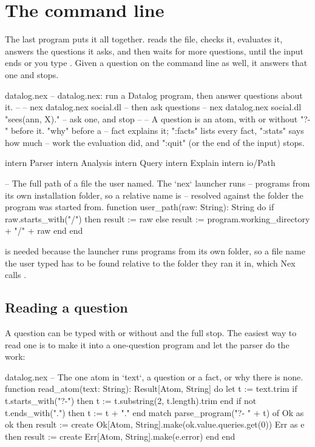 \chapter{The command line}\label{ch:commandline}

The last program puts it all together. 
reads the file, checks it, evaluates it, answers the questions it asks,
and then waits for more questions, until the input ends or you type
. Given a question on the command line as well, it answers that
one and stops.

\begin{newfile}{datalog.nex}
-- datalog.nex: run a Datalog program, then answer questions about it.
--
--   nex datalog.nex social.dl                     -- then ask questions
--   nex datalog.nex social.dl "sees(ann, X)."     -- ask one, and stop
--
-- A question is an atom, with or without "?-" before it. "why" before a
-- fact explains it; ":facts" lists every fact, ":stats" says how much
-- work the evaluation did, and ":quit" (or the end of the input) stops.

intern Parser
intern Analysis
intern Query
intern Explain
intern io/Path

-- The full path of a file the user named. The `nex` launcher runs
-- programs from its own installation folder, so a relative name is
-- resolved against the folder the program was started from.
function user_path(raw: String): String
do
  if raw.starts_with("/") then
    result := raw
  else
    result := program.working_directory + "/" + raw
  end
end
\end{newfile}

 is needed because the  launcher runs programs
from its own folder, so a file name the user typed has to be found relative
to the folder they ran it in, which Nex calls .

\section{Reading a question}

A question can be typed with or without  and the full stop. The
easiest way to read one is to make it into a one-question program and let
the parser do the work:

\begin{continued}{datalog.nex}
-- The one atom in `text`, a question or a fact, or why there is none.
function read_atom(text: String): Result[Atom, String]
do
  let t := text.trim
  if t.starts_with("?-") then
    t := t.substring(2, t.length).trim
  end
  if not t.ends_with(".") then
    t := t + "."
  end
  match parse_program("?- " + t) of
    Ok as ok then result := create Ok[Atom, String].make(ok.value.queries.get(0))
    Err as e then result := create Err[Atom, String].make(e.error)
  end
end
\end{continued}

